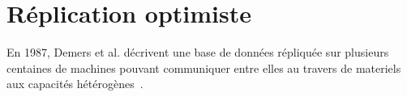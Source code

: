\section{Réplication optimiste}
\label{repl:sec:optimistic}

En 1987, Demers et al. décrivent une base de données répliquée sur plusieurs
centaines de machines pouvant communiquer entre elles au travers de materiels
aux capacités hétérogènes~\cite{demers1987epidemic}.



